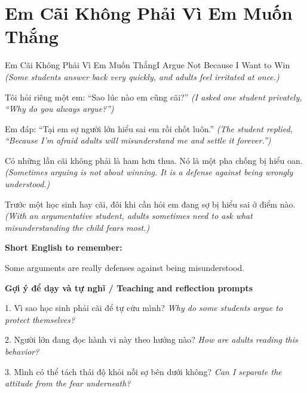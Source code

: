 \section{Em Cãi Không Phải Vì Em Muốn Thắng}
\begin{truyen}{Em Cãi Không Phải Vì Em Muốn Thắng}{I Argue Not Because I Want to Win}
\textit{(Some students answer back very quickly, and adults feel irritated at once.)}

Tôi hỏi riêng một em: “Sao lúc nào em cũng cãi?”
\textit{(I asked one student privately, “Why do you always argue?”)}

Em đáp: “Tại em sợ người lớn hiểu sai em rồi chốt luôn.”
\textit{(The student replied, “Because I'm afraid adults will misunderstand me and settle it forever.”)}

Có những lần cãi không phải là ham hơn thua. Nó là một pha chống bị hiểu oan.
\textit{(Sometimes arguing is not about winning. It is a defense against being wrongly understood.)}

\end{truyen}

\begin{baihoc}
Trước một học sinh hay cãi, đôi khi cần hỏi em đang sợ bị hiểu sai ở điểm nào.
\textit{(With an argumentative student, adults sometimes need to ask what misunderstanding the child fears most.)}
\end{baihoc}

\begin{ghinhoanh}
\textbf{Short English to remember:}

Some arguments are really defenses against being misunderstood.

\end{ghinhoanh}

\begin{tuhocnhanh}
\textbf{Gợi ý để dạy và tự nghĩ / Teaching and reflection prompts}

1. Vì sao học sinh phải cãi để tự cứu mình? \textit{Why do some students argue to protect themselves?}

2. Người lớn đang đọc hành vi này theo hướng nào? \textit{How are adults reading this behavior?}

3. Mình có thể tách thái độ khỏi nỗi sợ bên dưới không? \textit{Can I separate the attitude from the fear underneath?}
\end{tuhocnhanh}
\ngancach

